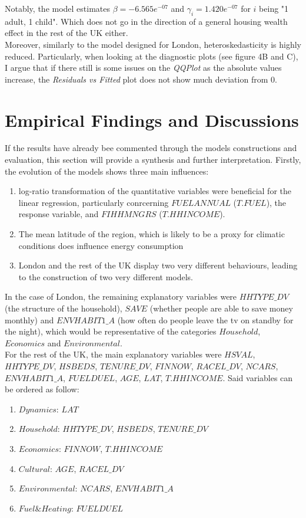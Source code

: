 \documentclass[12pt]{article}
\begin{document}
Notably, the model estimates $\beta = -6.565e^{-07}$ and $\gamma_i = 1.420e^{-07}$ for $i$ being "1 adult, 1 child". Which does not go in the direction of a general housing wealth effect in the rest of the UK either.\\

Moreover, similarly to the model designed for London, heteroskedasticity is highly reduced. Particularly, when looking at the diagnostic plots (see figure 4B and C), I argue that if there still is some issues on the \textit{QQPlot} as the absolute values increase, the \textit{Residuals vs Fitted} plot does not show much deviation from 0.

\section{Empirical Findings and Discussions}

If the results have already bee commented through the models constructions and evaluation, this section will provide a synthesis and further interpretation. Firstly, the evolution of the models shows three main influences:\\

\begin{enumerate}
\item log-ratio transformation of the quantitative variables were beneficial for the linear regression, particularly conrcerning $FUELANNUAL$ ($T.FUEL$), the response variable, and $FIHHMNGRS$ ($T.HHINCOME$).
\item The mean latitude of the region, which is likely to be a proxy for climatic conditions does influence energy consumption
\item London and the rest of the UK display two very different behaviours, leading to the construction of two very different models. \\
\end{enumerate}

In the case of London, the remaining explanatory variables were $HHTYPE\_DV$ (the structure of the household), $SAVE$ (whether people are able to save money monthly) and $ENVHABIT1\_A$ (how often do people leave the tv on standby for the night), which would be representative of the categories $Household$, $Economics$ and $Environmental$.\\

For the rest of the UK, the main explanatory variables were $HSVAL$, $HHTYPE\_DV$, $HSBEDS$, $TENURE\_DV$, $FINNOW$, $RACEL\_DV$, $NCARS$, $ENVHABIT1\_A$, $FUELDUEL$, $AGE$, $LAT$, $T.HHINCOME$.
Said variables can be ordered as follow:
\begin{enumerate}
\item $Dynamics$: $LAT$
\item $Household$: $HHTYPE\_DV$, $HSBEDS$, $TENURE\_DV$
\item $Economics$: $FINNOW$, $T.HHINCOME$
\item $Cultural$: $AGE$, $RACEL\_DV$
\item $Environmental$: $NCARS$, $ENVHABIT1\_A$
\item $Fuel \& Heating$: $FUELDUEL$ \\
\end{enumerate}
\end{document}
